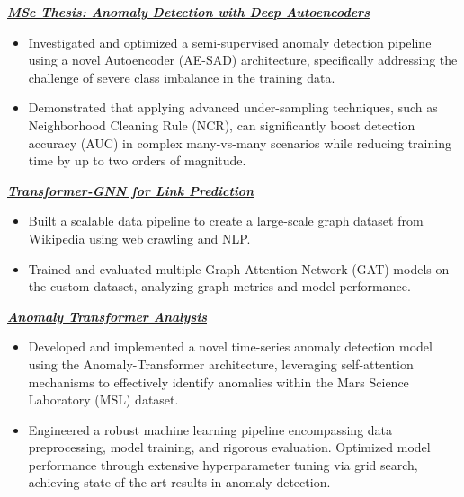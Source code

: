 \documentclass[9pt, a4paper]{article}
\newcommand{\cvproject}[1]{%
	\par {\large{\bfseries{\textit{#1}}}} \par \vspace{4pt}
}
\begin{document}
\begin{minipage}[t]{0.70\linewidth}
		\cvproject{\href{https://github.com/bGuzzo/msc-ai-ml-thesis-anomaly-detection}{MSc Thesis: Anomaly Detection with Deep Autoencoders}}
		\begin{itemize}[leftmargin=*, nosep]
			\item \footnotesize Investigated and optimized a semi-supervised anomaly detection pipeline using a novel Autoencoder (AE-SAD) architecture, specifically addressing the challenge of severe class imbalance in the training data.
			\item \footnotesize Demonstrated that applying advanced under-sampling techniques, such as Neighborhood Cleaning Rule (NCR), can significantly boost detection accuracy (AUC) in complex many-vs-many scenarios while reducing training time by up to two orders of magnitude.
		\end{itemize}
		
		\vspace{6pt}
		\cvproject{\href{https://github.com/bGuzzo/transformer-gnn-link-prediction}{Transformer-GNN for Link Prediction}}
		\begin{itemize}[leftmargin=*, nosep]
			\item \footnotesize Built a scalable data pipeline to create a large-scale graph dataset from Wikipedia using web crawling and NLP.
			\item \footnotesize Trained and evaluated multiple Graph Attention Network (GAT) models on the custom dataset, analyzing graph metrics and model performance.
		\end{itemize}
		
		\vspace{6pt}
		\cvproject{\href{https://github.com/bGuzzo/Anomaly-Transformer-Analysis}{Anomaly Transformer Analysis}}
		\begin{itemize}[leftmargin=*, nosep]
			\item \footnotesize Developed and implemented a novel time-series anomaly detection model using the Anomaly-Transformer architecture, leveraging self-attention mechanisms to effectively identify anomalies within the Mars Science Laboratory (MSL) dataset.
			\item \footnotesize Engineered a robust machine learning pipeline encompassing data preprocessing, model training, and rigorous evaluation. Optimized model performance through extensive hyperparameter tuning via grid search, achieving state-of-the-art results in anomaly detection.
		\end{itemize}
			

\end{minipage}
\end{document}
